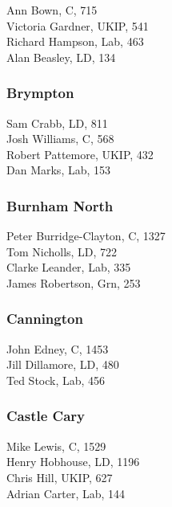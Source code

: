 \documentclass[a4paper,openany,10pt]{book}
\begin{document}


Ann Bown, C, 715\\
Victoria Gardner, UKIP, 541\\
Richard Hampson, Lab, 463\\
Alan Beasley, LD, 134\\


\subsubsection*{Brympton}



Sam Crabb, LD, 811\\
Josh Williams, C, 568\\
Robert Pattemore, UKIP, 432\\
Dan Marks, Lab, 153\\


\subsubsection*{Burnham North}



Peter Burridge-Clayton, C, 1327\\
Tom Nicholls, LD, 722\\
Clarke Leander, Lab, 335\\
James Robertson, Grn, 253\\


\subsubsection*{Cannington}



John Edney, C, 1453\\
Jill Dillamore, LD, 480\\
Ted Stock, Lab, 456\\


\subsubsection*{Castle Cary}



Mike Lewis, C, 1529\\
Henry Hobhouse, LD, 1196\\
Chris Hill, UKIP, 627\\
Adrian Carter, Lab, 144\\
\end{document}
